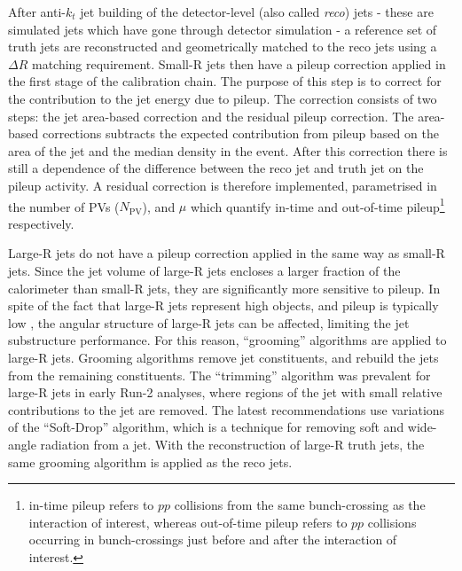 After anti-$k_t$ jet building of the detector-level (also called \textit{reco}) jets - these are simulated jets which have gone through detector simulation - a reference set of truth jets are reconstructed and geometrically matched to the reco jets using a $\Delta R$ matching requirement. Small-R jets then have a pileup correction applied in the first stage of the calibration chain. The purpose of this step is to correct for the contribution to the jet energy due to pileup. The correction consists of two steps: the jet area-based correction and the residual pileup correction. The area-based corrections subtracts the expected contribution from pileup based on the area of the jet and the median \pt density in the event. After this correction there is still a dependence of the difference between the reco jet and truth jet \pt on the pileup activity. A residual correction is therefore implemented, parametrised in the number of PVs ($N_{\text{PV}}$), and $\mu$ which quantify in-time and out-of-time pileup\footnote{in-time pileup refers to $pp$ collisions from the same bunch-crossing as the interaction of interest, whereas out-of-time pileup refers to $pp$ collisions occurring in bunch-crossings just before and after the interaction of interest.} respectively.

Large-R jets do not have a pileup correction applied in the same way as small-R jets. Since the jet volume of large-R jets encloses a larger fraction of the calorimeter than small-R jets, they are significantly more sensitive to pileup. In spite of the fact that large-R jets represent high \pt objects, and pileup is typically low \pt, the angular structure of large-R jets can be affected, limiting the jet substructure performance. For this reason, ``grooming'' algorithms are applied to large-R jets. Grooming algorithms remove jet constituents, and rebuild the jets from the remaining constituents. The ``trimming'' algorithm was prevalent for large-R jets in early Run-2 analyses, where regions of the jet with small relative contributions to the jet \pt are removed. The latest recommendations use variations of the ``Soft-Drop'' algorithm, which is a technique for removing soft and wide-angle radiation from a jet. With the reconstruction of large-R truth jets, the same grooming algorithm is applied as the reco jets.  

